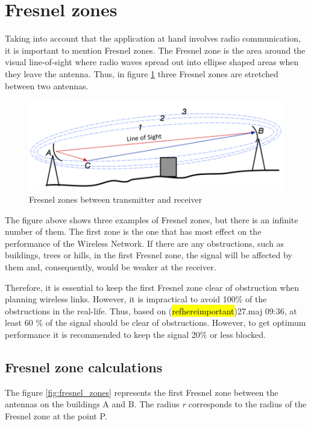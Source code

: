 \section{Fresnel zones}\label{sec:fresnel}
Taking into account that the application at hand involves radio communication, it is important to mention Fresnel zones. The Fresnel zone is the area around the visual line-of-sight where radio waves spread out into ellipse shaped areas when they leave the antenna. Thus, in figure \ref{fig:3fresnel_zones} three Fresnel zones are stretched between two antennas. 

\begin{figure}[H]
	\centering
	\includegraphics[scale=0.65]{figures/fresnel_zones.png}
	\caption{Fresnel zones between transmitter and receiver}
	\label{fig:3fresnel_zones}
\end{figure}

The figure above shows three examples of Fresnel zones, but there is an infinite number of them. The first zone is the one that has most effect on the performance of the Wireless Network. If there are any obstructions, such as buildings, trees or hills, in the first Fresnel zone, the signal will be affected by them and, consequently, would be weaker at the receiver.

Therefore, it is essential to keep the first Fresnel zone clear of obstruction when planning wireless links. However, it is impractical to avoid 100$\%$ of the obstructions in the real-life. Thus, based on (\hl{refhereimportant})27.maj 09:36, at least 60 $\%$ of the signal should be clear of obstructions. However, to get optimum performance it is recommended to keep the signal 20$\%$ or less blocked.

\subsection{Fresnel zone calculations}
The figure \ref{fig:fresnel_zones} represents the first Fresnel zone between the antennas on the buildings A and B. The radius \textit{r} corresponds to the radius of the Fresnel zone at the point P. 

